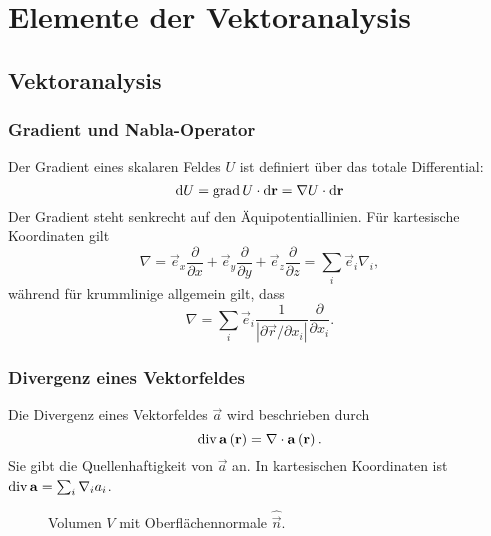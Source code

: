 

\chapter{Elemente der Vektoranalysis\label{elemente_der_vektoranalysis}}

\section{Vektoranalysis}

\subsection{Gradient und Nabla-Operator}

Der Gradient eines skalaren Feldes $U$ ist definiert über das totale Differential:
\begin{equation*}
	\mathop{}\!\mathrm{d} U=\operatorname{grad} U\cdot \mathop{}\!\mathrm{d} \mathbf{r}=\nabla U\cdot \mathop{}\!\mathrm{d} \mathbf{r}
\end{equation*}
Der Gradient steht senkrecht auf den Äquipotentiallinien. Für kartesische Koordinaten gilt
\begin{equation*}
	\nabla =\vec {e}_{x}\frac{\partial }{\partial x}+\vec {e}_{y}\frac{\partial }{\partial y}+\vec {e}_{z}\frac{\partial }{\partial z}=\sum _{i}\vec {e}_{i}\nabla _{i},
\end{equation*}
während für krummlinige allgemein gilt, dass
\begin{equation*}
	\nabla =\sum _{i}\vec {e}_{i}\frac{1}{\left| \partial \vec {r}/\partial x_{i}\right| }\frac{\partial }{\partial x_{i}}.
\end{equation*}
\subsection{Divergenz eines Vektorfeldes\label{ref-007}}

Die Divergenz eines Vektorfeldes $\vec {a}$ wird beschrieben durch
\begin{equation*}
	\operatorname{div} \mathbf{a}\left(\mathbf{r}\right)=\nabla \cdot \mathbf{a}\left(\mathbf{r}\right).
\end{equation*}
Sie gibt die Quellenhaftigkeit von $\vec {a}$ an. In kartesischen Koordinaten ist $\operatorname{div} \mathbf{a}=\sum _{i}\nabla _{i}a_{i}$.



\begin{figure}[htb]
	\centering
	\tfigCubeWithNormal
	\caption{Volumen $V$ mit Oberflächennormale $\hat{\vec{n}}$. }
	\label{fig:volume_with_normal}
\end{figure}

